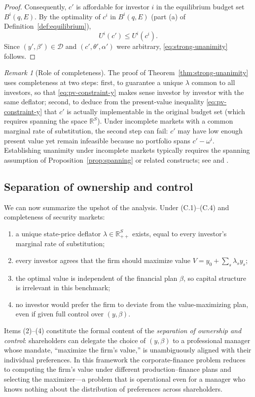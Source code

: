 \documentclass[11pt,a4paper,oneside]{book}
\def\R{\mathbb{R}}
\def\leq{\leqslant}
\theoremstyle{plain}
\theoremstyle{definition}
\theoremstyle{remark}
\newtheorem{remark}[theorem]{Remark}
\numberwithin{equation}{chapter}
\begin{document}
\begin{proof}
Consequently, $c'$ is affordable for investor $i$ in the equilibrium budget set $B^i(q, E)$.
By the optimality of $c^i$ in $B^i(q, E)$ (part (a) of Definition~\ref{def:equilibrium}),
\begin{equation*}
  U^i(c') \leq U^i(c^i).
\end{equation*}
Since $(y', \beta') \in \mathcal{D}$ and $(c', \theta', \alpha')$ were arbitrary, \eqref{eq:strong-unanimity} follows.
\end{proof}

\begin{remark}[Role of completeness]\label{rem:completeness-strong}
The proof of Theorem~\ref{thm:strong-unanimity} uses completeness at two steps: first, to guarantee a unique $\lambda$ common to all investors, so that \eqref{eq:pv-constraint-y} makes sense investor by investor with the same deflator; second, to deduce from the present-value inequality \eqref{eq:pv-constraint-y} that $c'$ is actually implementable in the original budget set (which requires spanning the space $\R^S$).
Under incomplete markets with a common marginal rate of substitution, the second step can fail: $c'$ may have low enough present value yet remain infeasible because no portfolio spans $c' - \omega^i$.
Establishing unanimity under incomplete markets typically requires the spanning assumption of Proposition~\ref{prop:spanning} or related constructs; see \citet{Geanakoplos1990} and \citet{MagillQuinzii2009}.
\end{remark}

\subsection{Separation of ownership and control}

We can now summarize the upshot of the analysis.
Under \textup{(C.1)--(C.4)} and completeness of security markets:
\begin{enumerate}
  \item a unique state-price deflator $\lambda \in \R^S_{++}$ exists, equal to every investor's marginal rate of substitution;
  \item every investor agrees that the firm should maximize value $V = y_0 + \sum_s \lambda_s y_s$;
  \item the optimal value is independent of the financial plan $\beta$, so capital structure is irrelevant in this benchmark;
  \item no investor would prefer the firm to deviate from the value-maximizing plan, even if given full control over $(y, \beta)$.
\end{enumerate}
Items (2)--(4) constitute the formal content of the \emph{separation of ownership and control}: shareholders can delegate the choice of $(y, \beta)$ to a professional manager whose mandate, ``maximize the firm's value,'' is unambiguously aligned with their individual preferences.
In this framework the corporate-finance problem reduces to computing the firm's value under different production--finance plans and selecting the maximizer---a problem that is operational even for a manager who knows nothing about the distribution of preferences across shareholders.
\end{document}
